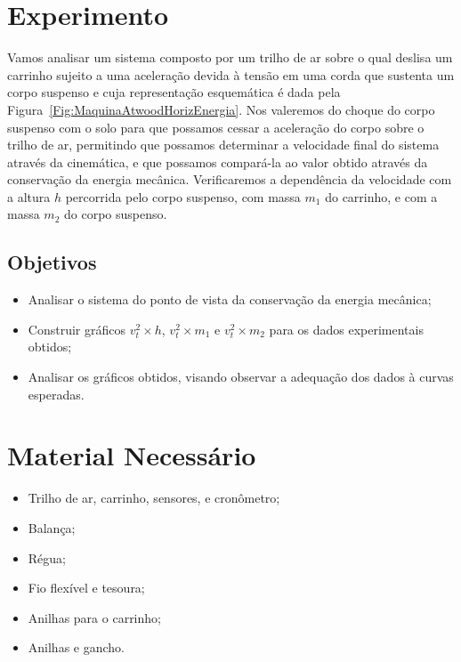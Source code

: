 \section{Experimento}

Vamos analisar um sistema composto por um trilho de ar sobre o qual deslisa um carrinho sujeito a uma aceleração devida à tensão em uma corda que sustenta um corpo suspenso e cuja representação esquemática é dada pela Figura~\ref{Fig:MaquinaAtwoodHorizEnergia}. Nos valeremos do choque do corpo suspenso com o solo para que possamos cessar a aceleração do corpo sobre o trilho de ar, permitindo que possamos determinar a velocidade final do sistema através da cinemática, e que possamos compará-la ao valor obtido através da conservação da energia mecânica. Verificaremos a dependência da velocidade com a altura $h$ percorrida pelo corpo suspenso, com massa $m_1$ do carrinho, e com a massa $m_2$ do corpo suspenso.

\subsection{Objetivos}

\begin{itemize}
	\item Analisar o sistema do ponto de vista da conservação da energia mecânica;
	\item Construir gráficos $v_t^2 \times h$, $v_t^2 \times m_1$ e $v_t^2 \times m_2$ para os dados experimentais obtidos;
	\item Analisar os gráficos obtidos, visando observar a adequação dos dados à curvas esperadas.
\end{itemize}

\section{Material Necessário}

\begin{itemize}
	\item Trilho de ar, carrinho, sensores, e cronômetro;
	\item Balança;
	\item Régua;
	\item Fio flexível e tesoura;
	\item Anilhas para o carrinho;
	\item Anilhas e gancho.
\end{itemize}

